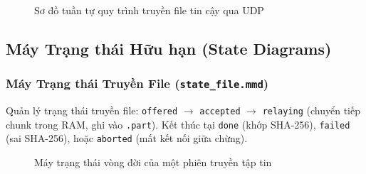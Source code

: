 \begin{figure}[H]
    \centering
    \caption{Sơ đồ tuần tự quy trình truyền file tin cậy qua UDP}
    \label{fig:seq_file}
\end{figure}

\subsection{Máy Trạng thái Hữu hạn (State Diagrams)}

\subsubsection{Máy Trạng thái Truyền File (\texttt{state\_file.mmd})}
Quản lý trạng thái truyền file: \texttt{offered} $\rightarrow$ \texttt{accepted} $\rightarrow$ \texttt{relaying} (chuyển tiếp chunk trong RAM, ghi vào \texttt{.part}). Kết thúc tại \texttt{done} (khớp SHA-256), \texttt{failed} (sai SHA-256), hoặc \texttt{aborted} (mất kết nối giữa chừng).

\begin{figure}[H]
    \centering
    \caption{Máy trạng thái vòng đời của một phiên truyền tập tin}
    \label{fig:state_file}
\end{figure}

